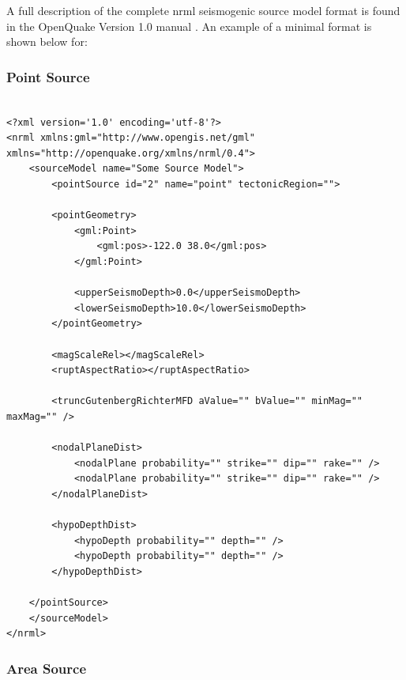 A full description of the complete nrml seismogenic source model format is found in the OpenQuake Version 1.0 manual \cite{crowley2010}. An example of a minimal format is shown below for:

\subsubsection{Point Source}

\begin{Verbatim}[frame=single, commandchars=\\\{\}, fontsize=\scriptsize, samepage=true]

<?xml version='1.0' encoding='utf-8'?>
<nrml xmlns:gml="http://www.opengis.net/gml" xmlns="http://openquake.org/xmlns/nrml/0.4">
    <sourceModel name="Some Source Model">
        <pointSource id="2" name="point" tectonicRegion="">

        <pointGeometry>
            <gml:Point>
                <gml:pos>-122.0 38.0</gml:pos>
            </gml:Point>

            <upperSeismoDepth>0.0</upperSeismoDepth>
            <lowerSeismoDepth>10.0</lowerSeismoDepth>
        </pointGeometry>

        <magScaleRel></magScaleRel>
        <ruptAspectRatio></ruptAspectRatio>

        <truncGutenbergRichterMFD aValue="" bValue="" minMag="" maxMag="" />

        <nodalPlaneDist>
            <nodalPlane probability="" strike="" dip="" rake="" />
            <nodalPlane probability="" strike="" dip="" rake="" />
        </nodalPlaneDist>

        <hypoDepthDist>
            <hypoDepth probability="" depth="" />
            <hypoDepth probability="" depth="" />
        </hypoDepthDist>

    </pointSource>
    </sourceModel>
</nrml>

\end{Verbatim}


\subsubsection{Area Source}

